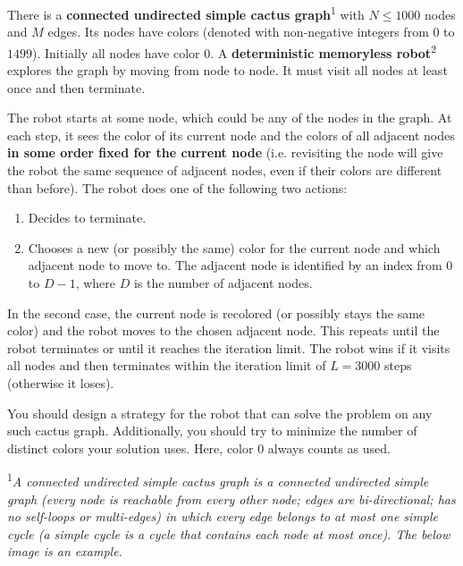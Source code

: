 \documentclass[12pt]{article}
\begin{document}
\renewcommand{\round}{Day 2}
\renewcommand{\problemName}{Task Navigation}
\renewcommand{\lang}{English}

\renewcommand{\tl}{$3$ sec.}
\renewcommand{\ml}{$512$ MB}
\problem{\problemName}

There is a \textbf{connected undirected simple cactus graph}\textsuperscript{1} with $N \leq 1000$ nodes and $M$ edges. Its nodes have colors (denoted with non-negative integers from $0$ to $1499$). Initially all nodes have color $0$. A \textbf{deterministic memoryless robot}\textsuperscript{2} explores the graph by moving from node to node. It must visit all nodes at least once and then terminate.

The robot starts at some node, which could be any of the nodes in the graph. At each step, it sees the color of its current node and the colors of all adjacent nodes \textbf{in some order fixed for the current node} (i.e. revisiting the node will give the robot the same sequence of adjacent nodes, even if their colors are different than before). The robot does one of the following two actions:
\begin{enumerate}
    \item Decides to terminate.
    \item Chooses a new (or possibly the same) color for the current node and which adjacent node to move to. The adjacent node is identified by an index from $0$ to $D-1$, where $D$ is the number of adjacent nodes.
\end{enumerate}

In the second case, the current node is recolored (or possibly stays the same color) and the robot moves to the chosen adjacent node. This repeats until the robot terminates or until it reaches the iteration limit. The robot wins if it visits all nodes and then terminates within the iteration limit of $L = 3000$ steps (otherwise it loses).

You should design a strategy for the robot that can solve the problem on any such cactus graph. Additionally, you should try to minimize the number of distinct colors your solution uses. Here, color 0 always counts as used.

\textsuperscript{1}\textit{A connected undirected simple cactus graph is a connected undirected simple graph (every node is reachable from every other node; edges are bi-directional; has no self-loops or multi-edges) in which every edge belongs to at most one simple cycle (a simple cycle is a cycle that contains each node at most once). The below image is an example.}
\end{document}

